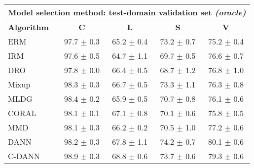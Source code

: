 \documentclass{article}
\begin{document}
\begin{center}
\begin{tabular}{lcccc}
\toprule
\multicolumn{5}{c}{\textbf{Model selection method: test-domain validation set \textit{(oracle)}}} \\
\midrule
\textbf{Algorithm}    & \textbf{C}                & \textbf{L}                & \textbf{S}                & \textbf{V}                \\
\midrule
ERM                       & 97.7 $\pm$ 0.3            & 65.2 $\pm$ 0.4            & 73.2 $\pm$ 0.7            & 75.2 $\pm$ 0.4            \\
IRM                       & 97.6 $\pm$ 0.5            & 64.7 $\pm$ 1.1            & 69.7 $\pm$ 0.5            & 76.6 $\pm$ 0.7            \\
DRO                 & 97.8 $\pm$ 0.0            & 66.4 $\pm$ 0.5            & 68.7 $\pm$ 1.2            & 76.8 $\pm$ 1.0            \\
Mixup                     & 98.3 $\pm$ 0.3            & 66.7 $\pm$ 0.5            & 73.3 $\pm$ 1.1            & 76.3 $\pm$ 0.8            \\
MLDG                      & 98.4 $\pm$ 0.2            & 65.9 $\pm$ 0.5            & 70.7 $\pm$ 0.8            & 76.1 $\pm$ 0.6            \\
CORAL                     & 98.1 $\pm$ 0.1            & 67.1 $\pm$ 0.8            & 70.1 $\pm$ 0.6            & 75.8 $\pm$ 0.5            \\
MMD                       & 98.1 $\pm$ 0.3            & 66.2 $\pm$ 0.2            & 70.5 $\pm$ 1.0            & 77.2 $\pm$ 0.6            \\
DANN                       & 98.2 $\pm$ 0.3            & 67.8 $\pm$ 1.1            & 74.2 $\pm$ 0.7            & 80.1 $\pm$ 0.6            \\
C-DANN                   & 98.9 $\pm$ 0.3            & 68.8 $\pm$ 0.6            & 73.7 $\pm$ 0.6            & 79.3 $\pm$ 0.6            \\
\bottomrule
\end{tabular}
\end{center}

\clearpage
\newpage
\end{document}
